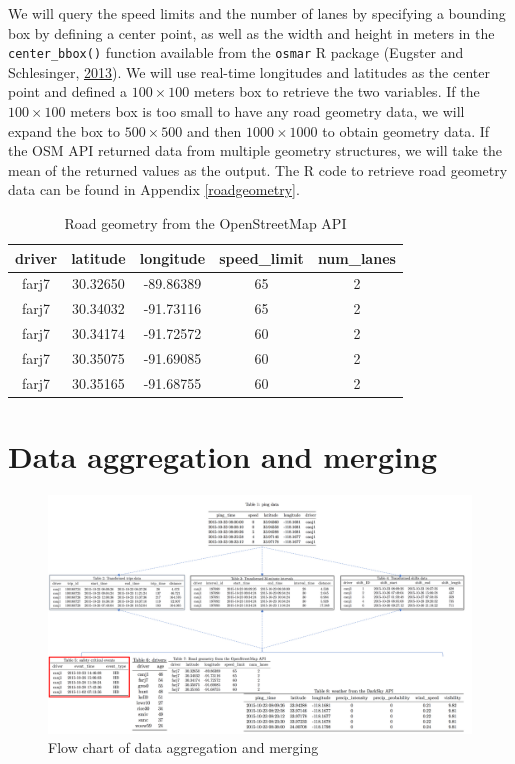 \documentclass[12pt]{book}
\numberwithin{equation}{chapter}
\begin{document}
We will query the speed limits and the number of lanes by specifying a bounding box by defining a center point, as well as the width and height in meters in the \texttt{center\_bbox()} function available from the \texttt{osmar} R package (Eugster and Schlesinger, \protect\hyperlink{ref-eugster2013osmar}{2013}).
We will use real-time longitudes and latitudes as the center point and defined a \(100\times100\) meters box to retrieve the two variables.
If the \(100\times100\) meters box is too small to have any road geometry data, we will expand the box to \(500\times500\) and then \(1000\times1000\) to obtain geometry data.
If the OSM API returned data from multiple geometry structures, we will take the mean of the returned values as the output.
The R code to retrieve road geometry data can be found in Appendix \ref{roadgeometry}.

\begin{longtable}{ccccc}
\caption{\label{tab:road}Road geometry from the OpenStreetMap API}\\
\toprule
driver & latitude & longitude & speed\_limit & num\_lanes\\
\midrule
farj7 & 30.32650 & -89.86389 & 65 & 2\\
farj7 & 30.34032 & -91.73116 & 65 & 2\\
farj7 & 30.34174 & -91.72572 & 60 & 2\\
farj7 & 30.35075 & -91.69085 & 60 & 2\\
farj7 & 30.35165 & -91.68755 & 60 & 2\\
\bottomrule
\end{longtable}

\hypertarget{data-aggregation-and-merging}{%
\section{Data aggregation and merging}\label{data-aggregation-and-merging}}

\begin{figure}[!ht]

{\centering \includegraphics[width=\linewidth]{figs/Data_merging} 

}

\caption{Flow chart of data aggregation and merging}\label{fig:unnamed-chunk-1}
\end{figure}
\end{document}
